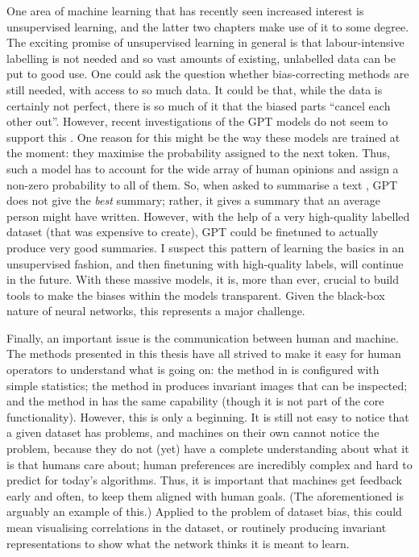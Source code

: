 One area of machine learning that has recently seen increased interest is unsupervised learning,
and the latter two chapters make use of it to some degree.
The exciting promise of unsupervised learning in general is
that labour-intensive labelling is not needed and so vast amounts of existing, unlabelled data can be put to good use.
One could ask the question whether bias-correcting methods are still needed, with access to so much data.
It could be that, while the data is certainly not perfect,
there is so much of it that the biased parts ``cancel each other out''.
However, recent investigations of the GPT models \citep{radford2018improving,radford2019language,brown2020language} do not seem to support this \citep{khalifa2021distributional}.
One reason for this might be the way these models are trained at the moment:
they maximise the probability assigned to the next token.
Thus, such a model has to account for the wide array of human opinions and assign a non-zero probability to all of them.
So, when asked to summarise a text \citep{stiennon2020learning}, GPT does not give the \emph{best} summary;
rather, it gives a summary that an average person might have written.
However, with the help of a very high-quality labelled dataset (that was expensive to create),
GPT could be finetuned to actually produce very good summaries.
I suspect this pattern of learning the basics in an unsupervised fashion,
and then finetuning with high-quality labels, will continue in the future.
With these massive models,
it is, more than ever, crucial to build tools to make the biases within the models transparent.
Given the black-box nature of neural networks, this represents a major challenge.

Finally, an important issue is the communication between human and machine.
The methods presented in this thesis have all strived to make it easy for human operators to understand what is going on:
the method in  is configured with simple statistics;
the method in  produces invariant images that can be inspected;
and the method in  has the same capability
(though it is not part of the core functionality).
However, this is only a beginning.
It is still not easy to notice that a given dataset has problems,
and machines on their own cannot notice the problem,
because they do not (yet) have a complete understanding about what it is that humans care about;
human preferences are incredibly complex \citep{yudkowsky2011complex} and hard to predict for today's algorithms.
Thus, it is important that machines get feedback early and often,
to keep them aligned with human goals.
(The aforementioned \citet{stiennon2020learning} is arguably an example of this.)
Applied to the problem of dataset bias,
this could mean visualising correlations in the dataset,
or routinely producing invariant representations to show what the network thinks it is meant to learn.
